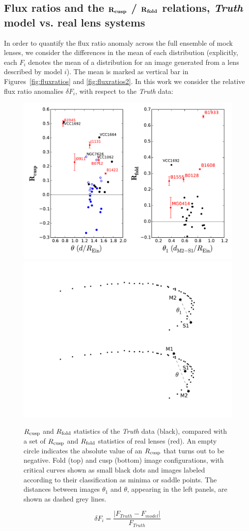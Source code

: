 \subsection{Flux ratios and the $\bf{R_{cusp}}$ / $\bf{R_{fold}}$ relations, \textit{Truth} model vs. real lens systems}
In order to quantify the flux ratio anomaly across the full ensemble
of mock lenses, we consider the differences in the mean of each
distribution (explicitly, each $F_{i}$ denotes the mean of a
distribution for an image generated from a lens described by model
$i$). The mean is marked as vertical bar in
Figures~\ref{fig:fluxratios} and \ref{fig:fluxratios2}. In this work we consider the relative flux ratio anomalies $\delta F_i$, with respect to the \textit{Truth} data:
\begin{figure}
	\centering
	\includegraphics[trim=0cm 0cm 0cm 0cm,clip,width=.6\textwidth]{./figures_sls/dmax_vs_Rcuspfold-eps-converted-to.pdf}
	\includegraphics[trim=12cm 1cm 0cm 0.5cm,clip,width=.3\textwidth]{./figures_sls/fold_theta1.pdf}
	\caption{\label{fig:Rcuspfold_vs_real}$R_{\rm{cusp}}$ and $R_{\rm{fold}}$ statistics of the \textit{Truth} data (black), compared with a set of $R_{\rm{cusp}}$ and $R_{\rm{fold}}$ statistics of real lenses (red). An empty circle indicates the absolute value of an $R_{\rm{cusp}}$ that turns out to be negative. Fold (top) and cusp (bottom) image configurations,  with critical curves shown as small black dots and images labeled according to their classification as minima or saddle points. The distances between images $\theta_1$ and $\theta$, appearing in the left panels, are shown as dashed grey lines.}
\end{figure}
\begin{equation}
\nonumber \delta F_i = \frac{| F_{Truth} - F_{model} |}{F_{Truth}}
\end{equation}

